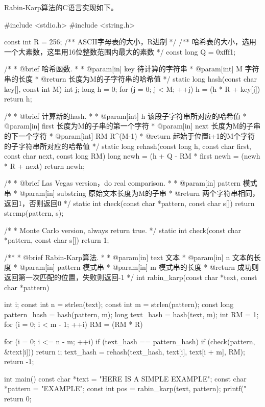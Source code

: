 Rabin-Karp算法的C语言实现如下。
\begin{Codex}[label=rabin_karp.c]
#include <stdio.h>
#include <string.h>

const int R = 256;  /** ASCII字母表的大小，R进制 */
/** 哈希表的大小，选用一个大素数，这里用16位整数范围内最大的素数 */
const long Q = 0xfff1;

/*
 * @brief 哈希函数.
 *
 * @param[in] key 待计算的字符串
 * @param[int] M 字符串的长度
 * @return 长度为M的子字符串的哈希值
 */
static long hash(const char key[], const int M) {
    int j;
    long h = 0;
    for (j = 0; j < M; ++j) h = (h * R + key[j]) %
    return h;
}

/*
 * @brief 计算新的hash.
 *
 * @param[int] h 该段子字符串所对应的哈希值
 * @param[in] first 长度为M的子串的第一个字符
 * @param[in] next 长度为M的子串的下一个字符
 * @param[int] RM R^(M-1) %
 * @return 起始于位置i+1的M个字符的子字符串所对应的哈希值
 */
static long rehash(const long h, const char first, const char next,
                   const long RM) {
    long newh = (h + Q - RM * first %
    newh = (newh * R + next) %
    return newh;
}

/*
 * @brief Las Vegas version，do real comparison.
 *
 * @param[in] pattern 模式串
 * @param[in] substring 原始文本长度为M的子串
 * @return 两个字符串相同，返回1，否则返回0
 */
static int check(const char *pattern, const char s[]) {
    return strcmp(pattern, s);
}

/*
 * Monte Carlo version, always return true.
 */
static int check(const char *pattern, const char s[]) {
    return 1;
}

/**
 * @brief Rabin-Karp算法.
 *
 * @param[in] text 文本
 * @param[in] n 文本的长度
 * @param[in] pattern 模式串
 * @param[in] m 模式串的长度
 * @return 成功则返回第一次匹配的位置，失败则返回-1
 */
int rabin_karp(const char *text, const char *pattern) {
    int i;
    const int n = strlen(text);
    const int m = strlen(pattern);
    const long pattern_hash = hash(pattern, m);
    long text_hash = hash(text, m);
    int RM = 1;
    for (i = 0; i < m - 1; ++i) RM = (RM * R) %

    for (i = 0; i <= n - m; ++i) {
        if (text_hash == pattern_hash) {
            if (check(pattern, &text[i])) return i;
        }
        text_hash = rehash(text_hash, text[i], text[i + m], RM);
    }
    return -1;
}


int main() {
    const char *text = "HERE IS A SIMPLE EXAMPLE";
    const char *pattern = "EXAMPLE";
    const int pos = rabin_karp(text, pattern);
    printf("%
    return 0;
}
\end{Codex}


